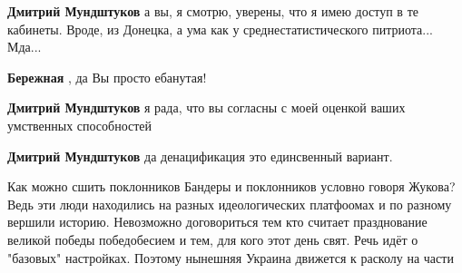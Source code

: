 \begin{itemize}
\begin{itemize}
\textbf{Дмитрий Мундштуков} а вы, я смотрю, уверены, что я имею доступ в те кабинеты. Вроде, из Донецка, а ума как у среднестатистического питриота... Мда...

 
\textbf{Бережная} , да Вы просто ебанутая! \Laughey[1.0][white]\Laughey[1.0][white]

 
\textbf{Дмитрий Мундштуков} я рада, что вы согласны с моей оценкой ваших умственных способностей

 
\textbf{Дмитрий Мундштуков} да денацификация это единсвенный вариант.
\end{itemize}

 

Как можно сшить поклонников Бандеры и поклонников условно говоря Жукова? Ведь
эти люди находились на разных идеологических платфоомах и по разному вершили
историю. Невозможно договориться тем кто считает празднование великой победы
победобесием и тем, для кого этот день свят. Речь идёт о "базовых" настройках.
Поэтому нынешняя Украина движется к расколу на части

\begin{itemize}
 

\end{itemize}
\end{itemize}
